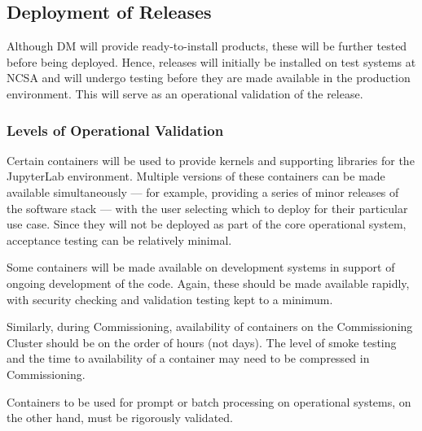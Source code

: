 \subsection{Deployment of Releases}\label{sect:reldep}

Although DM will provide ready-to-install products, these will be further tested before being deployed.
Hence, releases will initially be installed on test systems at NCSA and will undergo testing before they are made available in the production environment.
This will serve as an operational validation of the release.

\subsubsection{Levels of Operational Validation}

Certain containers will be used to provide kernels and supporting libraries for the JupyterLab environment.
Multiple versions of these containers can be made available simultaneously --- for example, providing a series of minor releases of the software stack --- with the user selecting which to deploy for their particular use case.
Since they will not be deployed as part of the core operational system, acceptance testing can be relatively minimal.

Some containers will be made available on development systems in support of ongoing development of the code.
Again, these should be made available rapidly, with security checking and validation testing kept to a minimum.

Similarly, during Commissioning, availability of containers on the Commissioning Cluster should be on the order of hours (not days).
The level of smoke testing and the time to availability of a container may need to be compressed in Commissioning.

Containers to be used for prompt or batch processing on operational systems, on the other hand, must be rigorously validated.
